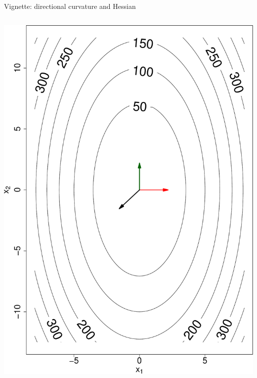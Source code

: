 \documentclass[ignorenonframetext,aspectratio=169]{beamer}
\begin{document}
\begin{frame}{Vignette: directional curvature and Hessian}
\begin{columns}
\begin{column}{0.4\textwidth}
\begin{center}\includegraphics[height=0.42\textheight]{lecture9_files/figure-beamer/unnamed-chunk-7-1} \end{center}
\end{column}
\end{columns}

\end{frame}
\end{document}
